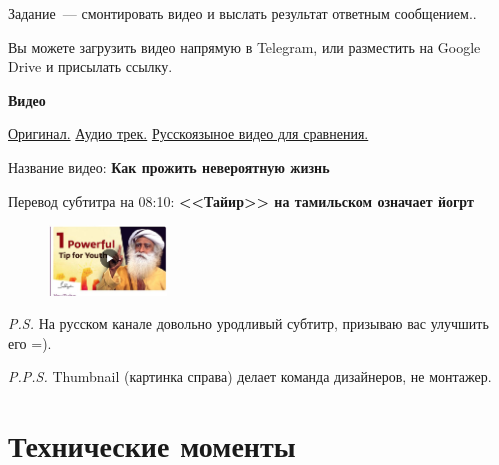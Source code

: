 \documentclass[
a4paper, %
12pt, %
article,
onecolumn, %
openany, %
]{memoir}
\begin{document}
Задание~--- смонтировать видео и выслать результат
ответным сообщением..

Вы можете загрузить видео напрямую в Telegram, или разместить
на Google Drive и присылать ссылку.

\begin{center} \textbf{Видео} \end{center}
\href{https://www.youtube.com/watch?v=9sGJUR7stzc}{Оригинал.}
\quad
\href{https://drive.google.com/file/d/1Y6ECjMSvkaUFmNawIePfFvqS2ZnB3SPi/view?usp=sharing}{Аудио трек.}
\quad
\href{https://www.youtube.com/watch?v=Q3NYDF4JyTg}{Русскоязыное видео для сравнения.}

Название видео: \textbf{Как прожить невероятную жизнь}

Перевод субтитра на 08:10: \textbf{<<Тайир>> на тамильском означает йогрт}


\begin{figure}
    \begin{center}
        \includegraphics[width=0.28\textwidth]{thumbnail}
    \end{center}
\end{figure}

\emph{P.S.} На русском канале довольно уродливый субтитр, призываю вас улучшить его =).

\emph{P.P.S.} Thumbnail (картинка справа) делает команда дизайнеров, не монтажер.


\newpage
\section{Технические моменты}
\end{document}
